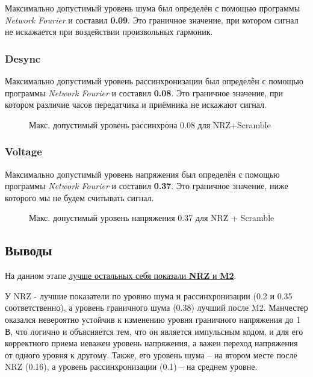 Максимально допустимый уровень шума был определён с помощью программы \textit{Network Fourier} и составил \textbf{0.09}. Это граничное значение, при котором сигнал не искажается при воздействии произвольных гармоник.

\newpage

\subsubsection{Desync}

Максимально допустимый уровень рассинхронизации был определён с помощью программы \textit{Network Fourier} и составил \textbf{0.08}. Это граничное значение, при котором различие часов передатчика и приёмника не искажают сигнал.

\vspace{0.4cm}
\begin{figure}[h]
	\centering
	\caption{Макс. допустимый уровень рассинхрона 0.08 для NRZ+Scramble}
\end{figure}

\subsubsection{Voltage}

Максимально допустимый уровень напряжения был определён с помощью программы \textit{Network Fourier} и составил \textbf{0.37}. Это граничное значение, ниже которого мы не будем считывать сигнал.

\vspace{0.4cm}
\begin{figure}[h]
	\centering
	\caption{Макс. допустимый уровень напряжения 0.37 для NRZ + Scramble}
\end{figure}




\subsection{Выводы}

На данном этапе \underline{лучше остальных себя показали \textbf{NRZ} и \textbf{M2}}. 

У NRZ - лучшие показатели по уровню шума и рассинхронизации (0.2 и 0.35 соответственно), а уровень граничного шума (0.38) лучший после M2. Манчестер оказался невероятно устойчив к изменению уровня граничного напряжения до 1 В, что логично и объясняется тем, что он является импульсным кодом, и для его корректного приема неважен уровень напряжения, а важен переход напряжения от одного уровня к другому. Также, его уровень шума – на втором месте после NRZ (0.16), а уровень рассинхронизации (0.1) – на среднем уровне.

